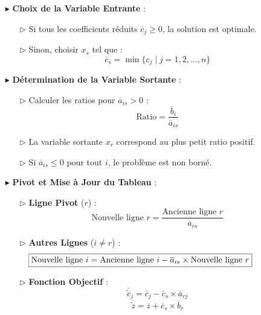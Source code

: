 \documentclass{report}
\begin{document}
\begin{multicols*}{2}
\begin{itemize}
        \item[$\blacktriangleright$] \textbf{Choix de la Variable Entrante} :
            \begin{itemize}
                \item[$\rhd$] Si tous les coefficients réduits \( \overline{c}_j \geq 0 \), la solution est optimale.
                \item[$\rhd$] Sinon, choisir \( x_s \) tel que :
                \[%
                \boxed{\overline{c}_s = \min \{ c_j \mid j = 1, 2, \dots, n \}}
                \]%
            \end{itemize}

        \item[$\blacktriangleright$] \textbf{Détermination de la Variable Sortante} :
            \begin{itemize}
                \item[$\rhd$] Calculer les ratios pour \( \overline{a}_{is} > 0 \) :
                \[%
                \boxed{\text{Ratio} = \dfrac{\overline{b}_i}{\overline{a}_{is}}}
                \]%
                \item[$\rhd$] La variable sortante \( x_r \) correspond au plus petit ratio positif.
                \item[$\rhd$] Si \( \overline{a}_{is} \leq 0 \) pour tout \( i \), le problème est non borné.
            \end{itemize}

        \item[$\blacktriangleright$] \textbf{Pivot et Mise à Jour du Tableau} :
        \begin{itemize}
            \item[$\rhd$] \textbf{Ligne Pivot} (\( r \)) :
            \[
            \boxed{\text{Nouvelle ligne } r = \dfrac{\text{Ancienne ligne } r}{\overline{a}_{rs}}}
            \]
            \item[$\rhd$] \textbf{Autres Lignes} (\( i \neq r \)) :
            \[
                \hspace{-4em}\boxed{\text{Nouvelle ligne } i = \text{Ancienne ligne } i - \overline{a}_{is} \times \text{Nouvelle ligne } r}
            \]
            \item[$\rhd$] \textbf{Fonction Objectif} :
            \[
                \boxed{\overline{\tilde{c}}_j = \overline{c}_j - \overline{c}_s \times \overline{a}_{rj}}
            \]
            \[
                \boxed{\overline{\tilde{z}} = \overline{z} + \overline{c}_s \times \overline{b}_r}
            \]
        \end{itemize}


\end{itemize}
\end{multicols*}
\end{document}
